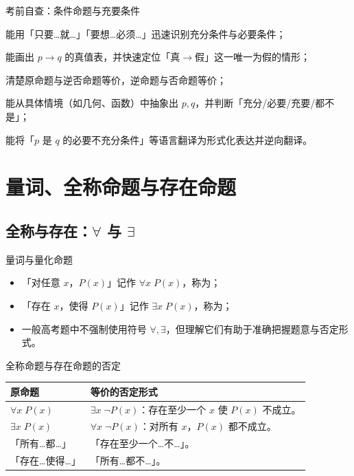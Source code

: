 \documentclass[a4paper,11pt]{ctexart}
\begin{document}
\begin{NoteChecklist}{考前自查：条件命题与充要条件}
  \item 能用「只要\ldots{}就\ldots{}」「要想\ldots{}必须\ldots{}」迅速识别充分条件与必要条件；
  \item 能画出 $p\to q$ 的真值表，并快速定位「真$\to$假」这一唯一为假的情形；
  \item 清楚原命题与逆否命题等价，逆命题与否命题等价；
  \item 能从具体情境（如几何、函数）中抽象出 $p,q$，并判断「充分/必要/充要/都不是」；
  \item 能将「$p$ 是 $q$ 的必要不充分条件」等语言翻译为形式化表达并逆向翻译。
\end{NoteChecklist}

\clearpage
\section{量词、全称命题与存在命题}

\subsection{全称与存在：\texorpdfstring{$\forall$}{forall} 与 \texorpdfstring{$\exists$}{exists}}

\begin{definitionbox}{量词与量化命题}
  \begin{itemize}
    \item 「对任意 $x$，$P(x)$」记作 $\forall x\;P(x)$，称为；
    \item 「存在 $x$，使得 $P(x)$」记作 $\exists x\;P(x)$，称为；
    \item 一般高考题中不强制使用符号 $\forall,\exists$，但理解它们有助于准确把握题意与否定形式。
  \end{itemize}
\end{definitionbox}

\begin{summarybox}{全称命题与存在命题的否定}
  \begin{center}
  \begin{tabularx}{0.98\textwidth}{>{\raggedright\arraybackslash}p{4.4cm}X}
    \toprule
    \textbf{原命题} & \textbf{等价的否定形式} \\
    \midrule
    $\forall x\;P(x)$ & $\exists x\;\neg P(x)$：存在至少一个 $x$ 使 $P(x)$ 不成立。 \\
    $\exists x\;P(x)$ & $\forall x\;\neg P(x)$：对所有 $x$，$P(x)$ 都不成立。 \\
    「所有\ldots{}都\ldots{}」 & 「存在至少一个\ldots{}不\ldots{}」。 \\
    「存在\ldots{}使得\ldots{}」 & 「所有\ldots{}都不\ldots{}」。 \\
    \bottomrule
  \end{tabularx}
  \end{center}
\end{summarybox}
\end{document}
